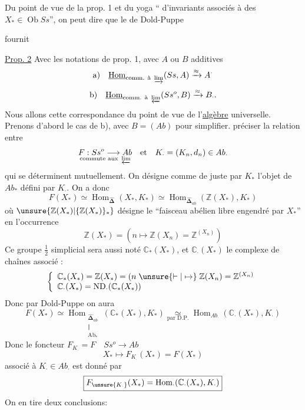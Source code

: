 Du point de vue de la prop. 1 et du yoga 
`` d'invariants associés à des $X_*\in\operatorname{Ob}Ss$'',
on peut dire que le  de Dold-Puppe

fournit 

\uline{Prop. 2} Avec les notations  de prop. 1, avec $A$ ou $B$
additives 
\[
 \text{a)}\quad\underline{\operatorname{Hom}}_{\text{comm. à }\varinjlim}(Ss,A)
 \xrightarrow{\approx}A^{\cdot}
\]
\[
 \text{b)}\quad\underline{\operatorname{Hom}}_{\text{comm. à }\varprojlim}(Ss^o,B)
 \xrightarrow{\approx}B_{\cdot}.
\]
Nous allons  cette correspondance du point
de vue de l'\uline{algèbre} universelle. Prenons d'abord le cas de b), avec
$B=(Ab)$ pour simplifier. 
 préciser la relation entre
\[
 \underset{\text{commute aux }\varprojlim}{F:Ss^o\longrightarrow Ab}
 \quad\text{et}\quad K_{\cdot}=(K_n,d_n)\in Ab_{\cdot}
\]
qui se déterminent mutuellement. On désigne comme de juste par $K_*$ l'objet
de $Ab_*$ défini par $K_{\cdot}$. On a donc
\[
 F(X_*)\simeq\operatorname{Hom}_{\widehat{\boldsymbol\Delta}}(X_*,K_*)
 \simeq\operatorname{Hom}_{\widehat{\boldsymbol\Delta}_{ab}}(\mathbb Z(X_*),K_*)
\]
où $\unsure{\mathbb Z(X_*)|\{\mathbb Z(X_*)\}_*}$ désigne le ``faisceau abélien
libre engendré par $X_*$'' en l'occurrence
\[
 \mathbb Z(X_*)=(n\longmapsto\mathbb Z(X_n)=\mathbb Z^{(X_n)})
\]
Ce groupe  $\tfrac12$ simplicial sera aussi noté $\mathbb C_*(X_*)$,
et $\mathbb C_{\cdot}(X_*)$ le complexe de chaînes associé :
\[
 \left\{\begin{array}{l}
 \mathbb C_*(X_*)=\mathbb Z(X_*)=(n\mathrel{\unsure{\vdash|\mapsto}}\mathbb Z(X_n)=\mathbb Z^{(X_n)}\\
 \mathbb C_{\cdot}(X_*)=\mathrm{ND}_{\cdot}(\mathbb C_*(X_*))
 \end{array}\right.
\]
Donc par Dold-Puppe on aura
\[
 F(X_*)\simeq
 \operatorname{Hom}_{\substack{\widehat{\boldsymbol\Delta}_{ab}\\\Vert\\\mathrm{Ab}_*}}
 (\mathbb C_*(X_*),K_*)
 \underset{\text{par D.P.}}{\simeq}
 \operatorname{Hom}_{Ab_{\cdot}}(\mathbb C_{\cdot}(X_*),K_{\cdot})
\]
Donc le foncteur $F_{K_{\cdot}}=F\quad Ss^o\longrightarrow Ab$
\[
 X_*\longmapsto F_{K_{\cdot}}(X_*)=F(X_*)
\]
associé à $K_{\cdot}\in Ab_{\cdot}$ est donné par
\[
 \boxed{F_{\unsure{K_{\cdot}}}(X_*)=\operatorname{Hom}_{\cdot}(\mathbb C_{\cdot}(X_*),K_{\cdot})}
\]
On en tire deux conclusions:

